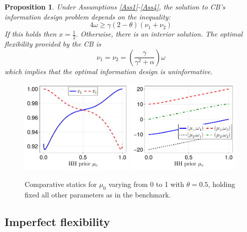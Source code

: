 \documentclass[12pt,a4paper]{article}
\newtheorem{proposition}{Proposition}
\begin{document}
\begin{proposition}
    \label{Prop4}
    Under Assumptions \ref{Ass1}-\ref{Ass4}, the solution to CB's information design problem depends on the inequality:
    \begin{equation}
    \label{threshold2}
        4\omega\geq\gamma(2-\theta)(\nu_1+\nu_2)
    \end{equation}
    If this holds then $x=\frac{1}{2}$. Otherwise, there is an interior solution. 
    The optimal flexibility provided by the CB is
    \begin{equation}
        \nu_1=\nu_2=\left(\frac{\gamma}{\gamma^2+\alpha}\right)\omega
    \end{equation}
    which implies that the optimal information design is uninformative.
\end{proposition}

\begin{figure}[H]
\centering
\includegraphics[width=0.49\textwidth]{figures/V11/γ=10.0-μ_0=0.5-α=1.0-θ=0.5-δ=0.5-ω_1=1.0-ω_2=-1.0/communication/fig_optimal_x_by_μ_0.pdf}
\includegraphics[width=0.49\textwidth]{figures/V11/γ=10.0-μ_0=0.5-α=1.0-θ=0.5-δ=0.5-ω_1=1.0-ω_2=-1.0/communication/fig_optimal_γ_by_μ_0.pdf}
\caption{Comparative statics for $\mu_0$ varying from 0 to 1 with $\theta = 0.5$, holding fixed all other parameters as in the benchmark.}
\label{Figure7}
\end{figure}


\subsection{Imperfect flexibility}
\end{document}
